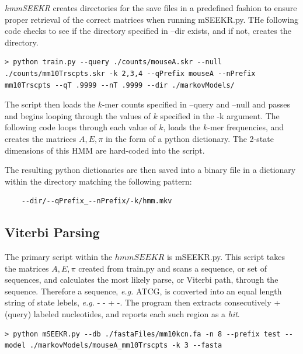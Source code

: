 \emph{hmmSEEKR} creates directories for the save files in a predefined fashion to ensure proper retrieval of the correct matrices when running mSEEKR.py. THe following code checks to see if the directory specified in --dir exists, and if not, creates the directory. 

\begin{verbatim}
> python train.py --query ./counts/mouseA.skr --null ./counts/mm10Trscpts.skr -k 2,3,4 --qPrefix mouseA --nPrefix mm10Trscpts --qT .9999 --nT .9999 --dir ./markovModels/
\end{verbatim}

The script then loads the $k$-mer counts specified in --query and --null and passes and begins looping through the values of $k$ specified in the -k argument. The following code loops through each value of $k$, loads the $k$-mer frequencies, and creates the matrices $A,E,\pi$ in the form of a python dictionary. The 2-state dimensions of this HMM are hard-coded into the script. 


The resulting python dictionaries are then saved into a binary file in a dictionary within the directory matching the following pattern:

\begin{verbatim}
    --dir/--qPrefix_--nPrefix/-k/hmm.mkv
\end{verbatim}
\subsection{Viterbi Parsing}
The primary script within the $hmmSEEKR$ is mSEEKR.py. This script takes the matrices $A,E,\pi$ created from train.py and scans a sequence, or set of sequences, and calculates the most likely parse, or Viterbi path, through the sequence. Therefore a sequence, \emph{e.g.} ATCG, is converted into an equal length string of state lebels, \emph{e.g.} - - + -. The program then extracts consecutively + (query) labeled nucleotides, and reports each such region as a \emph{hit}. 

\begin{verbatim}
> python mSEEKR.py --db ./fastaFiles/mm10kcn.fa -n 8 --prefix test --model ./markovModels/mouseA_mm10Trscpts -k 3 --fasta
\end{verbatim}

